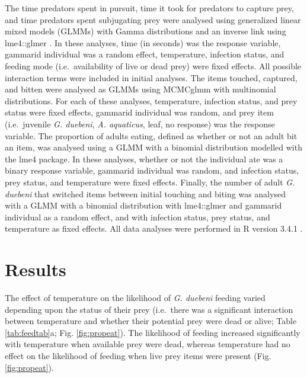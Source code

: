 The time predators spent in pursuit, time it took for predators to capture prey, and time predators spent subjugating prey were analysed using generalized linear mixed models (GLMMs) with Gamma distributions and an inverse link using lme4::glmer \citep{bates2015}. In these analyses, time (in seconds) was the response variable, gammarid individual was a random effect, temperature, infection status, and feeding mode (i.e.\ availability of live or dead prey) were fixed effects. All possible interaction terms were included in initial analyses. The items touched, captured, and bitten were analysed as GLMMs using MCMCglmm \citep{hadfield2010} with multinomial distributions. For each of these analyses, temperature, infection status, and prey status were fixed effects, gammarid individual was random, and prey item (i.e.\ juvenile \emph{G. duebeni}, \emph{A. aquaticus}, leaf, no response) was the response variable. The proportion of adults eating, defined as whether or not an adult bit an item, was analysed using a GLMM with a binomial distribution modelled with the lme4 package. In these analyses, whether or not the individual ate was a binary response variable, gammarid individual was random, and infection status, prey status, and temperature were fixed effects. Finally, the number of adult \emph{G. duebeni} that switched items between initial touching and biting was analysed with a GLMM with a binomial distribution with lme4::glmer and gammarid individual as a random effect, and with infection status, prey status, and temperature as fixed effects. All data analyses were performed in R version 3.4.1 \citep{r2017}.

\section{Results}

The effect of temperature on the likelihood of \emph{G. duebeni} feeding varied depending upon the status of their prey (i.e.\ there was a significant interaction between temperature and whether their potential prey were dead or alive; Table \ref{tab:feedtab}a; Fig. \ref{fig:propeat}). The likelihood of feeding increased significantly with temperature when available prey were dead, whereas temperature had no effect on the likelihood of feeding when live prey items were present (Fig. \ref{fig:propeat}). 




